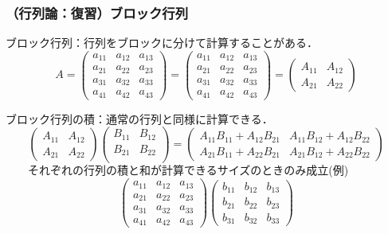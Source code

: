 \subsubsection{（行列論：復習）ブロック行列}

ブロック行列：行列をブロックに分けて計算することがある．
\begin{equation*}
	A =
	\left(\begin{array}{ccc}
			a_{11} & a_{12} & a_{13}\\
			a_{21} & a_{22} & a_{23}\\
			a_{31} & a_{32} & a_{33}\\
			a_{41} & a_{42} & a_{43}
	\end{array}\right)
	=
	\left(\begin{array}{c|cc}
			a_{11} & a_{12} & a_{13}\\
			a_{21} & a_{22} & a_{23}\\
			\hline
			a_{31} & a_{32} & a_{33}\\
			a_{41} & a_{42} & a_{43}
	\end{array}\right)
	=
	\left(\begin{array}{cc}
		A_{11} & A_{12} \\
		A_{21} & A_{22}
	\end{array}\right)
\end{equation*}

ブロック行列の積：通常の行列と同様に計算できる．
\begin{equation*}
	\left(\begin{array}{cc}
		A_{11} & A_{12} \\
		A_{21} & A_{22}
	\end{array}\right)
	\left(\begin{array}{cc}
		B_{11} & B_{12} \\
		B_{21} & B_{22} \\
	\end{array}\right)
	=
	\left(\begin{array}{cc}
		A_{11} B_{11} + A_{12} B_{21} & A_{11} B_{12} + A_{12} B_{22} \\
		A_{21} B_{11} + A_{22} B_{21} & A_{21} B_{12} + A_{22} B_{22}
	\end{array}\right)
\end{equation*}
　　それぞれの行列の積と和が計算できるサイズのときのみ成立(例)
\begin{equation*}
	\left(\begin{array}{c|cc}
			a_{11} & a_{12} & a_{13}\\
			a_{21} & a_{22} & a_{23}\\
			\hline
			a_{31} & a_{32} & a_{33}\\
			a_{41} & a_{42} & a_{43}
	\end{array}\right)
	\left(\begin{array}{cc|c}
			b_{11} & b_{12} & b_{13}\\
			\hline
			b_{21} & b_{22} & b_{23}\\
			b_{31} & b_{32} & b_{33}
	\end{array}\right)
\end{equation*}

